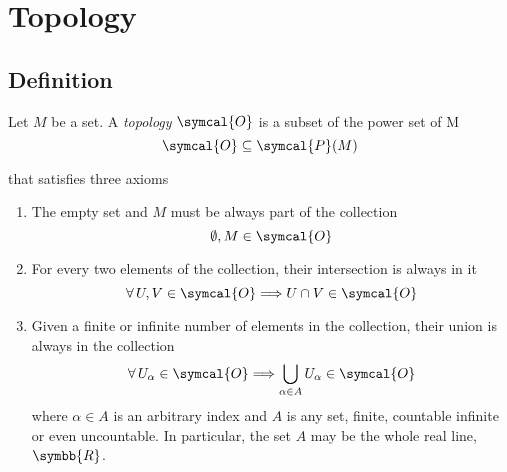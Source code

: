 \section{Topology}
\subsection{Definition}
Let $M$ be a set. A \emph{topology}\footnotemark{} $\symcal{O}$ is a subset of the power set of M
\begin{equation}
  \symcal{O} \subseteq \symcal{P}(M)
\end{equation}

that satisfies three axioms
\begin{enumerate}
\item The empty set and $M$ must be always part of the collection
  \begin{equation}
    \emptyset , M \in \symcal{O}
  \end{equation}
  
\item For every two elements of the collection, their intersection is always in it
  \begin{equation}
    \forall\, U, V \in\symcal{O}  \Longrightarrow U \cap V \in \symcal{O}
  \end{equation}
  
\item Given a finite or infinite number of elements in the collection, their union is always in
  the collection
  \begin{equation}
    \forall\, U_\alpha \in \symcal{O}  \Longrightarrow \bigcup_{\alpha\in A} U_\alpha \in \symcal{O}
  \end{equation}
  where $\alpha \in A$ is an arbitrary index and $A$ is any set, finite, countable infinite or even
  uncountable. In particular, the set $A$ may be the whole real line, $\symbb{R}$.
\end{enumerate}

